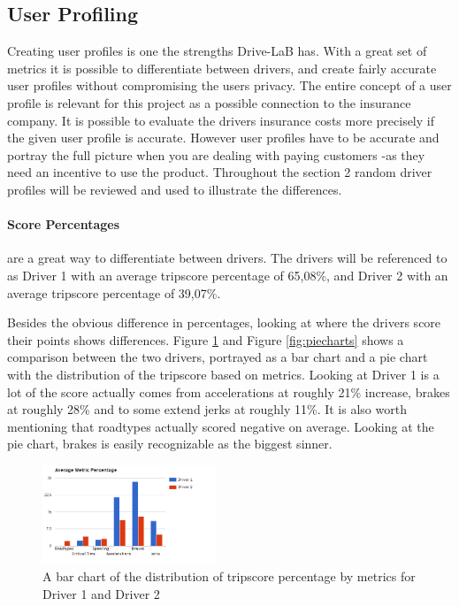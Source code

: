 \subsection{User Profiling}\label{subsec:userprofiling}

Creating user profiles is one the strengths Drive-LaB has. With a great set of metrics it is possible to differentiate between drivers, and create fairly accurate user profiles without compromising the users privacy. The entire concept of a user profile is relevant for this project as a possible connection to the insurance company. It is possible to evaluate the drivers insurance costs more precisely if the given user profile is accurate. However user profiles have to be accurate and portray the full picture when you are dealing with paying customers\citep{art:insurtelematics} -as they need an incentive to use the product. Throughout the section 2 random driver profiles will be reviewed and used to illustrate the differences. 

\paragraph{Score Percentages} are a great way to differentiate between drivers. The drivers will be referenced to as Driver 1 with an average tripscore percentage of 65,08\%, and Driver 2 with an average tripscore percentage of 39,07\%.

Besides the obvious difference in percentages, looking at where the drivers score their points shows differences. Figure \ref{fig:avgmetricper} and Figure \ref{fig:piecharts} shows a comparison between the two drivers, portrayed as a bar chart and a pie chart with the distribution of the tripscore based on metrics. Looking at Driver 1 is a lot of the score actually comes from accelerations at roughly 21\% increase, brakes at roughly 28\% and to some extend jerks at roughly 11\%. It is also worth mentioning that roadtypes actually scored negative on average. Looking at the pie chart, brakes is easily recognizable as the biggest sinner.

\begin{figure}[tb]
\centering
\includegraphics[width=0.465\textwidth]{Pictures/AverageMetricsPercentage}
\caption{A bar chart of the distribution of tripscore percentage by metrics for Driver 1 and Driver 2}
\label{fig:avgmetricper}
\end{figure}

